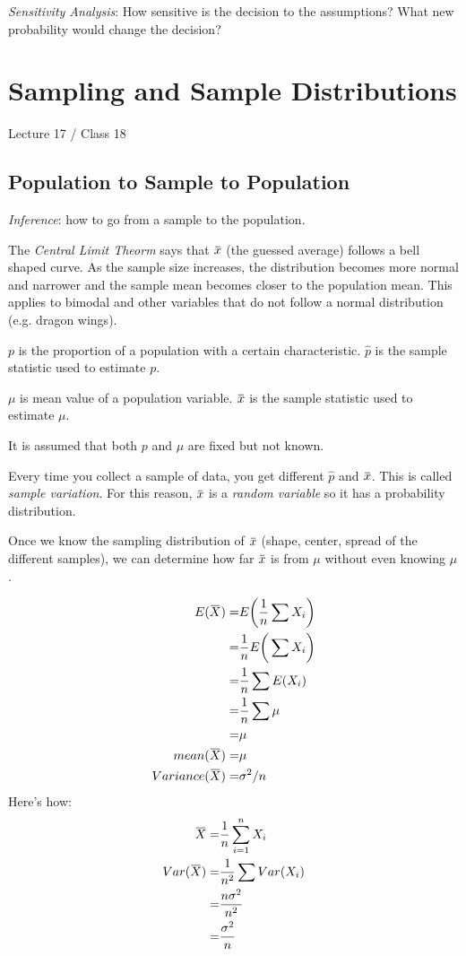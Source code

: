 \documentclass[11pt, oneside]{article}   	%
\newcommand{\overbar}[1]{\mkern 1.5mu\overline{\mkern-1.5mu#1\mkern-1.5mu}\mkern 1.5mu}
\begin{document}
\textit{Sensitivity Analysis}: How sensitive is the decision to the assumptions? What new probability would change the decision?


\section{Sampling and Sample Distributions}
Lecture 17 / Class 18

\subsection{Population to Sample to Population}

\textit{Inference}: how to go from a sample to the population.

The \textit{Central Limit Theorm} says that $\overbar{x}$ (the guessed average) follows a bell shaped curve. As the sample size increases, the distribution becomes more normal and narrower and the sample mean becomes closer to the population mean. This applies to bimodal and other variables that do not follow a normal distribution (e.g. dragon wings). 

$p$ is the proportion of a population with a certain characteristic. $\hat{p}$ is the sample statistic used to estimate $p$.

$\mu$ is mean value of a population variable. $\overbar{x}$ is the sample statistic used to estimate $\mu$.

It is assumed that both $p$ and $\mu$ are fixed but not known.

Every time you collect a sample of data, you get different $\hat{p}$ and $\overbar{x}$. This is called \textit{sample variation}. For this reason, $\overbar{x}$ is a \textit{random variable} so it has a probability distribution. 

Once we know the sampling distribution of $\overbar{x}$ (shape, center, spread of the different samples), we can determine how far $\overbar{x}$ is from $\mu$ without even knowing $\mu$.

\begin{align*}
E(\overbar{X}) =& E\bigg(\frac{1}{n} \sum X_i  \bigg) \\
 =& \frac{1}{n}E\bigg(\sum X_i \bigg) \\
 =& \frac{1}{n}\sum E(X_i)\\
 =& \frac{1}{n}\sum \mu \\
 =& \mu \\
mean(\overbar{X}) =& \mu \\
Variance(\overbar{X}) =& \sigma^2 / n \\
\end{align*}
Here's how:
\begin{align*}
\overbar{X} = & \frac{1}{n}\sum \limits_{i=1}^{n} X_i \\
Var(\overbar{X}) =& \frac{1}{n^2} \sum Var(X_i) \\
	=& \frac{n\sigma^2}{n^2} \\
	=& \frac{\sigma^2}{n}
\end{align*}
\end{document}
